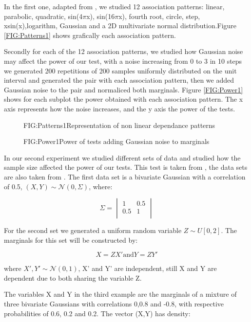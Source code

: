 \label{exp:1}In the first one, adapted from \cite{RDC1}, we studied 12 association patterns: linear, parabolic, quadratic, sin(4$\pi$x), sin(16$\pi$x), fourth root, circle, step, xsin(x),logarithm, Gaussian and a 2D multivariate normal distribution.Figure \ref{FIG:Patterns1} shows grafically each association pattern.

Secondly for each of the 12 association patterns, we studied how Gaussian noise may affect the power of our test, with a noise increasing from 0 to 3 in 10 steps we generated 200 repetitions of 200 samples uniformly distributed on the unit interval and generated the pair with each association pattern, then we added Gaussian noise to the pair and normaliced both marginals.
Figure \ref{FIG:Power1} shows for each subplot the power obtained with each association pattern. The x axis represents how the noise increases, and the y axis the power of the tests.
\FloatBarrier
\begin{figure}[Non linear dependance patterns example 1]{FIG:Patterns1}{Representation of non linear dependance patterns}
\end{figure}

\begin{figure}[Power of tests uniform marginals same size adding noise]{FIG:Power1}{Power of tests adding Gaussian noise to marginals}
\end{figure}
\FloatBarrier
In our second experiment we studied different sets of data and studied how the sample size affected the power of our tests. This test is taken from \cite{Size}, the data sets are also taken from \cite{Size}.
The first data set is a bivariate Gaussian with a correlation of 0.5, $(X,Y)\sim \mathcal{N}(0,\Sigma)$, where:

$$\Sigma =
\begin{vmatrix}
1&0.5\\
0.5&1\\
\end{vmatrix}
$$

For the second set we generated a uniform random variable $Z\sim U[0,2]$. The marginals for this set will be constructed by:

$$X=ZX' \text{and} Y = ZY'$$

where $X',Y' \sim \mathcal{N}(0,1)$, X' and Y' are independent, still X and Y are dependent due to both sharing the variable Z.

The variables X and Y in the third example are the marginals of a mixture of three bivariate Gaussians with correlations 0,0.8 and -0.8, with respective probabilities of 0.6, 0.2 and 0.2. 
The vector (X,Y) has density:

